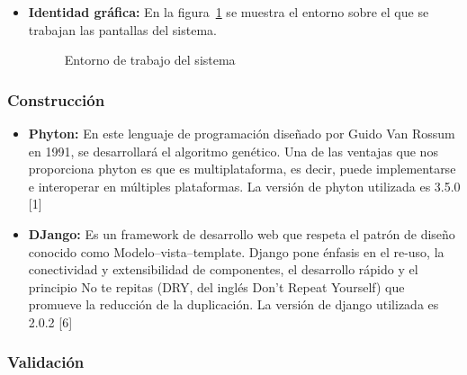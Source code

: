 \begin{itemize}
	\item \textbf{Identidad gráfica:} En la figura~\ref{fig:entornoTrabajo} se muestra el entorno sobre el que se trabajan las pantallas del sistema.
	
	\begin{figure}[htbp!]
		\begin{center}
			\caption{Entorno de trabajo del sistema}
			\label{fig:entornoTrabajo}
		\end{center}
	\end{figure}
	
	
	
\end{itemize}

\subsubsection{Construcción}

\begin{itemize}
	\item \textbf{Phyton:} En este lenguaje de programación diseñado por Guido Van Rossum en 1991, se desarrollará el algoritmo genético. Una de las ventajas que nos proporciona phyton es que es multiplataforma, es decir, puede implementarse e interoperar en múltiples plataformas. La versión de phyton utilizada es 3.5.0 [1] 
	
	\item \textbf{DJango:} Es un framework de desarrollo web que respeta el patrón de diseño conocido como Modelo–vista–template. Django pone énfasis en el re-uso, la conectividad y extensibilidad de componentes, el desarrollo rápido y el principio No te repitas (DRY, del inglés Don't Repeat Yourself) que promueve la reducción de la duplicación. La versión de django utilizada es 2.0.2 [6]
	
\end{itemize}


\subsubsection{Validación}

